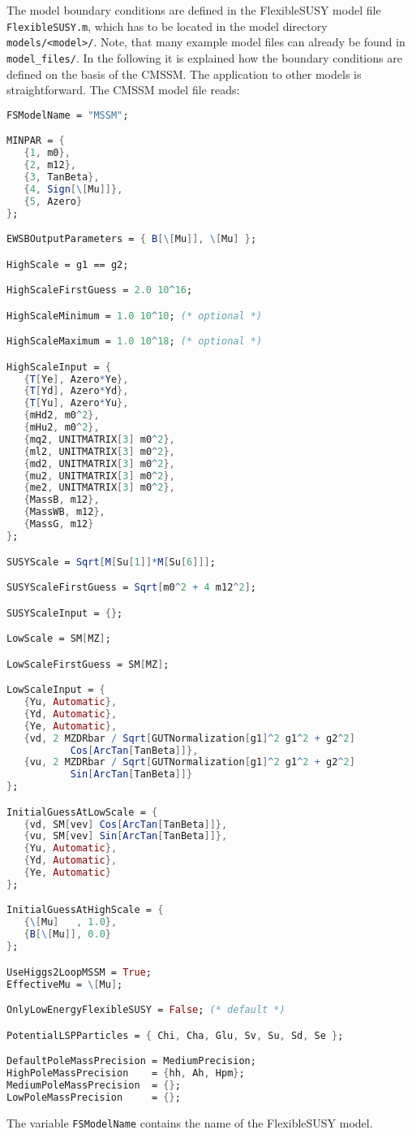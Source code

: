 \documentclass[final,3p,11pt,pdflatex]{elsarticle}
\makeatletter
\newcommand{\fs}{FlexibleSUSY\@\xspace}
\newcommand{\code}[1]{\lstinline|#1|}  %
\makeatother
\begin{document}
The model boundary conditions are defined in the \fs model file
\code{FlexibleSUSY.m}, which has to be located in the model directory
\code{models/<model>/}.  Note, that many example model files can
already be found in \code{model_files/}.  In the following it is
explained how the boundary conditions are defined on the basis of the
CMSSM.  The application to other models is straightforward.  The CMSSM
model file reads:
%
\begin{lstlisting}[language=Mathematica]
FSModelName = "MSSM";

MINPAR = {
   {1, m0},
   {2, m12},
   {3, TanBeta},
   {4, Sign[\[Mu]]},
   {5, Azero}
};

EWSBOutputParameters = { B[\[Mu]], \[Mu] };

HighScale = g1 == g2;

HighScaleFirstGuess = 2.0 10^16;

HighScaleMinimum = 1.0 10^10; (* optional *)

HighScaleMaximum = 1.0 10^18; (* optional *)

HighScaleInput = {
   {T[Ye], Azero*Ye},
   {T[Yd], Azero*Yd},
   {T[Yu], Azero*Yu},
   {mHd2, m0^2},
   {mHu2, m0^2},
   {mq2, UNITMATRIX[3] m0^2},
   {ml2, UNITMATRIX[3] m0^2},
   {md2, UNITMATRIX[3] m0^2},
   {mu2, UNITMATRIX[3] m0^2},
   {me2, UNITMATRIX[3] m0^2},
   {MassB, m12},
   {MassWB, m12},
   {MassG, m12}
};

SUSYScale = Sqrt[M[Su[1]]*M[Su[6]]];

SUSYScaleFirstGuess = Sqrt[m0^2 + 4 m12^2];

SUSYScaleInput = {};

LowScale = SM[MZ];

LowScaleFirstGuess = SM[MZ];

LowScaleInput = {
   {Yu, Automatic},
   {Yd, Automatic},
   {Ye, Automatic},
   {vd, 2 MZDRbar / Sqrt[GUTNormalization[g1]^2 g1^2 + g2^2]
           Cos[ArcTan[TanBeta]]},
   {vu, 2 MZDRbar / Sqrt[GUTNormalization[g1]^2 g1^2 + g2^2]
           Sin[ArcTan[TanBeta]]}
};

InitialGuessAtLowScale = {
   {vd, SM[vev] Cos[ArcTan[TanBeta]]},
   {vu, SM[vev] Sin[ArcTan[TanBeta]]},
   {Yu, Automatic},
   {Yd, Automatic},
   {Ye, Automatic}
};

InitialGuessAtHighScale = {
   {\[Mu]   , 1.0},
   {B[\[Mu]], 0.0}
};

UseHiggs2LoopMSSM = True;
EffectiveMu = \[Mu];

OnlyLowEnergyFlexibleSUSY = False; (* default *)

PotentialLSPParticles = { Chi, Cha, Glu, Sv, Su, Sd, Se };

DefaultPoleMassPrecision = MediumPrecision;
HighPoleMassPrecision    = {hh, Ah, Hpm};
MediumPoleMassPrecision  = {};
LowPoleMassPrecision     = {};
\end{lstlisting}
%
The variable \code{FSModelName} contains the name of the \fs model.
\end{document}
